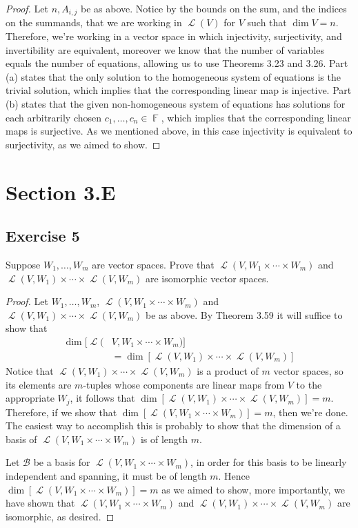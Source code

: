 \documentclass[letterpaper, 12pt]{amsart}
\DeclareMathOperator{\F}{\mathbb{F}}				%
\DeclareMathOperator{\Ell}{\mathscr{L}}				%
\theoremstyle{definition}  							%
\begin{document}
		\begin{proof}
		Let $n, A_{i,j}$ be as above.
		Notice by the bounds on the sum, and the indices on the summands, that we are working in $\Ell(V)$ for $V$ such that $\dim V = n$.
		Therefore, we're working in a vector space in which injectivity, surjectivity, and invertibility are equivalent, moreover we know that the number of variables equals the number of equations, allowing us to use Theorems 3.23 and 3.26.
		Part (a) states that the only solution to the homogeneous system of equations is the trivial solution, which implies that the corresponding linear map is injective. 
		Part (b) states that the given non-homogeneous system of equations has solutions for each arbitrarily chosen $c_{1}, \dots , c_{n} \in \F$, which implies that the corresponding linear maps is surjective.
		As we mentioned above, in this case injectivity is equivalent to surjectivity, as we aimed to show.
		\end{proof}

	\section*{Section 3.E}
		\subsection*{Exercise 5}
		Suppose $W_{1}, \dots, W_{m}$ are vector spaces. 
		Prove that $\Ell(V, W_{1} \times \cdots \times W_{m})$ and $\Ell(V,W_{1}) \times \cdots \times \Ell(V,W_{m})$ are isomorphic vector spaces.
		
		\begin{proof}
		Let $W_{1}, \dots, W_{m}$, $\Ell(V, W_{1} \times \cdots \times W_{m})$ and $\Ell(V,W_{1}) \times \cdots \times \Ell(V,W_{m})$ be as above.
		By Theorem 3.59 it will suffice to show that 
		\begin{align*}
			\dim [\Ell( & V, W_{1} \times \cdots \times W_{m})] \\
			&= \dim[\Ell(V,W_{1}) \times \cdots \times \Ell(V,W_{m})]
		\end{align*}
		Notice that $\Ell(V,W_{1}) \times \cdots \times \Ell(V,W_{m})$ is a product of $m$ vector spaces, so its elements are $m$-tuples whose components are linear maps from $V$ to the appropriate $W_{j}$, it follows that $\dim{[\Ell(V,W_{1}) \times \cdots \times \Ell(V,W_{m})]} = m$.
		Therefore, if we show that $\dim{[\Ell(V, W_{1} \times \cdots \times W_{m})]} = m$, then we're done.
		The easiest way to accomplish this is probably to show that the dimension of a basis of $\Ell(V, W_{1} \times \cdots \times W_{m})$ is of length $m$.

		Let $\mathcal{B}$ be a basis for $\Ell(V,W_{1} \times \cdots \times W_{m})$, in order for this basis to be linearly independent and spanning, it must be of length $m$.
		Hence $\dim{[\Ell(V,W_{1} \times \cdots \times W_{m})]} = m$ as we aimed to show, more importantly, we have shown that $\Ell(V, W_{1} \times \cdots \times W_{m})$ and $\Ell(V,W_{1}) \times \cdots \times \Ell(V,W_{m})$ are isomorphic, as desired.
		\end{proof}
\end{document}

